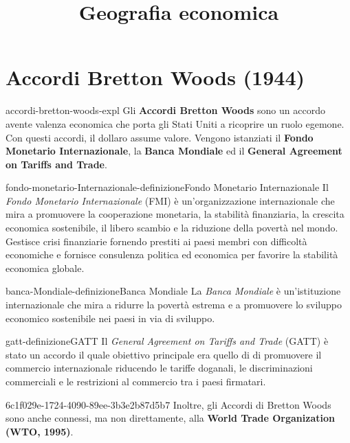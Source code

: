 \documentclass[preview]{standalone}
\begin{document}
\title{Geografia economica}
\genpage

\section{Accordi Bretton Woods (1944)}

\begin{snippet}{accordi-bretton-woods-expl}
    Gli \textbf{Accordi Bretton Woods} sono un accordo avente valenza economica
    che porta gli Stati Uniti a ricoprire un ruolo egemone. Con questi accordi, il
    dollaro assume valore. Vengono istanziati il \textbf{Fondo Monetario Internazionale},
    la \textbf{Banca Mondiale} ed il \textbf{General Agreement on Tariffs and Trade}.
\end{snippet}

\begin{snippetdefinition}{fondo-monetario-Internazionale-definizione}{Fondo Monetario Internazionale}
    Il \textit{Fondo Monetario Internazionale} (FMI) è un'organizzazione internazionale che mira a promuovere
    la cooperazione monetaria, la stabilità finanziaria,
    la crescita economica sostenibile, il libero scambio e la riduzione della povertà nel mondo.
    Gestisce crisi finanziarie fornendo prestiti ai paesi membri con difficoltà economiche e
    fornisce consulenza politica ed economica per favorire la stabilità economica globale.
\end{snippetdefinition}

\begin{snippetdefinition}{banca-Mondiale-definizione}{Banca Mondiale}
    La \textit{Banca Mondiale} è un'istituzione internazionale che mira a ridurre la povertà
    estrema e a promuovere lo sviluppo economico sostenibile nei paesi in via di sviluppo.
\end{snippetdefinition}

\begin{snippetdefinition}{gatt-definizione}{GATT}
    Il \textit{General Agreement on Tariffs and Trade} (GATT)
    è stato un accordo il quale obiettivo principale era quello di
    di promuovere il commercio internazionale riducendo le tariffe doganali,
    le discriminazioni commerciali e le restrizioni al commercio tra i paesi firmatari. 
\end{snippetdefinition}

\begin{snippet}{6c1f029e-1724-4090-89ee-3b3e2b87d5b7}
    Inoltre, gli Accordi di Bretton Woods sono anche connessi, ma non direttamente,
    alla \textbf{World Trade Organization (WTO, 1995)}.
\end{snippet}
\end{document}
